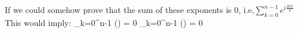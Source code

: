 \documentclass[preview]{standalone}
\begin{document}
\begin{center}
If we could somehow prove that the sum of these exponents is 0, i.e,$\sum_{k=0}^{n-1}e^{i\frac{2k\pi}{n}}$This would imply: \sum_{k=0}^{n-1} \cos\left(\right) = 0 \quad {} \quad \sum_{k=0}^{n-1} \sin\left(\right) = 0
\end{center}
\end{document}
